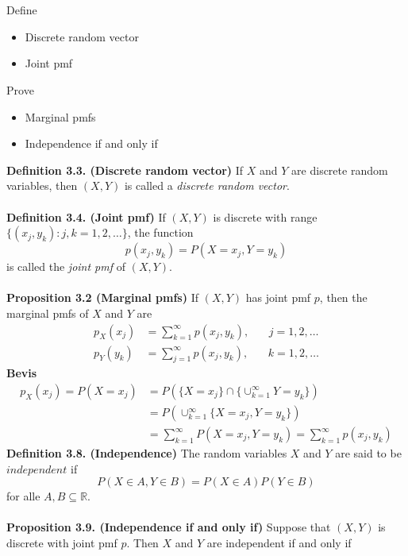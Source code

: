 \documentclass[12pt,a4paper,draft]{report}
\author{Frederik Appel Vardinghus-Nielsen}
\begin{document}
\\\\
Define
\begin{itemize}
\setlength\itemsep{0em}
\item Discrete random vector
\item Joint pmf
\end{itemize}
Prove
\begin{itemize}
\setlength\itemsep{0em}
\item Marginal pmfs
\item Independence if and only if
\end{itemize}
\textbf{Definition 3.3. (Discrete random vector)} If $X$ and $Y$ are discrete random variables, then $(X,Y)$ is called a \textit{discrete random vector}.\\\\
\textbf{Definition 3.4. (Joint pmf)} If $(X,Y)$ is discrete with range $\{(x_j,y_k):j,k=1,2,\ldots\}$, the function
\begin{equation}
p(x_j,y_k)=P(X=x_j,Y=y_k)
\end{equation}
is called the \textit{joint pmf} of $(X,Y)$.\\\\
\textbf{Proposition 3.2 (Marginal pmfs)} If $(X,Y)$ has joint pmf $p$, then the marginal pmfs of $X$ and $Y$ are
\begin{align*}
p_X(x_j)&=\sum_{k=1}^{\infty}p(x_j,y_k),\phantom{mm}j=1,2,\ldots\\
p_Y(y_k)&=\sum_{j=1}^{\infty}p(x_j,y_k),\phantom{mm}k=1,2,\ldots
\end{align*}
\textbf{Bevis}\\
\begin{align*}
p_X(x_j)=P(X=x_j)&=P\left(\{X=x_j\}\cap\{\cup_{k=1}^{\infty}Y=y_k\}\right)\\
&=P\left(\cup_{k=1}^{\infty}\{X=x_j,Y=y_k\}\right)\\
&=\sum_{k=1}^{\infty}P(X=x_j,Y=y_k)=\sum_{k=1}^{\infty}p(x_j,y_k)
\end{align*}
\textbf{Definition 3.8. (Independence)} The random variables $X$ and $Y$ are said to be $independent$ if
\begin{equation}
P(X\in A,Y\in B)=P(X\in A)P(Y\in B)
\end{equation}
for alle $A,B\subseteq\mathbb{R}$.\\\\
\textbf{Proposition 3.9. (Independence if and only if)} Suppose that $(X,Y)$ is discrete with joint pmf $p$. Then $X$ and $Y$ are independent if and only if
\end{document}

